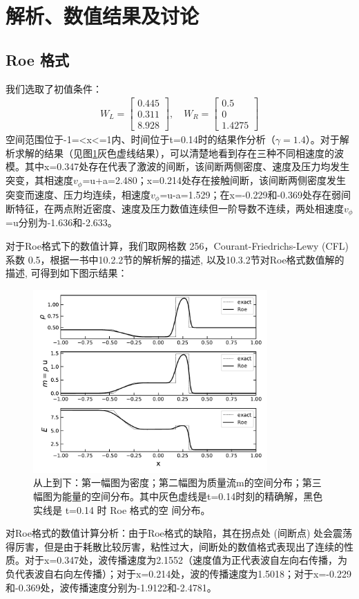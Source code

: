 \documentclass{article}
\begin{document}
\section{解析、数值结果及讨论}
\subsection{Roe 格式}
我们选取了初值条件：
\begin{align}
    W_L = \left[\begin{array}{l}
    0.445\\
    0.311\\
    8.928
    \end{array}\right], \quad W_R = \left[\begin{array}{l}
    0.5\\
    0\\
    1.4275
    \end{array}\right]
\end{align}
空间范围位于-1=<x<=1内、时间位于t=0.14时的结果作分析（$\gamma=1.4$）。对于解析求解的结果（见图\ref{fig:Roe}灰色虚线结果），可以清楚地看到存在三种不同相速度的波模。其中x=0.347处存在代表了激波的间断，该间断两侧密度、速度及压力均发生突变，其相速度$v_{\phi}$=u+a=2.480；x=0.214处存在接触间断，该间断两侧密度发生突变而速度、压力均连续，相速度$v_{\phi}$=u-a=1.529；在x=-0.229和-0.369处存在弱间断特征，在两点附近密度、速度及压力数值连续但一阶导数不连续，两处相速度$v_{\phi}$=u分别为-1.636和-2.633。
\par
对于Roe格式下的数值计算，我们取网格数 256，Courant-Friedrichs-Lewy (CFL) 系数 0.5，根据\cite{danaila2007}一书中10.2.2节的解析解的描述, 以及10.3.2节对Roe格式数值解的描述, 可得到如下图示结果：
\begin{figure}[H]
\centering
\includegraphics[width=0.8\textwidth]{Roe.pdf}
\caption{从上到下：第一幅图为密度；第二幅图为质量流m的空间分布；第三幅图为能量的空间分布。其中灰色虚线是t=0.14时刻的精确解，黑色实线是 t=0.14 时 Roe 格式的空
间分布。}
\label{fig:Roe}
\end{figure}
\par
对Roe格式的数值计算分析：由于Roe格式的缺陷，其在拐点处 (间断点) 处会震荡得厉害，但是由于耗散比较厉害，粘性过大，间断处的数值格式表现出了连续的性质。对于x=0.347处，波传播速度为2.1552（速度值为正代表波自左向右传播，为负代表波自右向左传播）；对于x=0.214处，波的传播速度为1.5018；对于x=-0.229和-0.369处，波传播速度分别为-1.9122和-2.4781。
\end{document}
